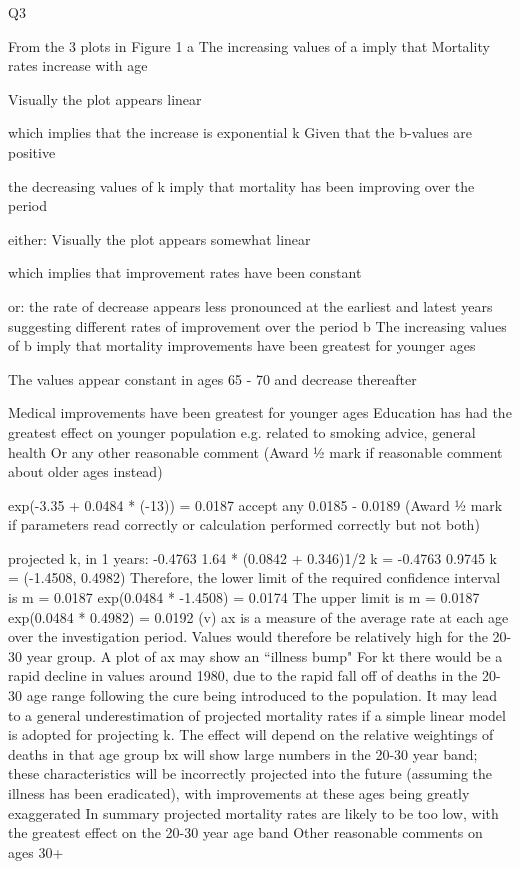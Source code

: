 \documentclass[a4paper,12pt]{article}
\begin{document}
Q3
\item  
From the 3 plots in Figure 1
a
The increasing values of a imply that Mortality rates increase with age \item 
Visually the plot appears linear \item 
which implies that the increase is exponential 
k
Given that the b-values are positive \item 
\medskip 
the decreasing values of k imply that mortality has been improving over the period \item 
either: Visually the plot appears somewhat linear \item 
which implies that improvement rates have been constant \item 
or: the rate of decrease appears less pronounced at the earliest and latest years
suggesting different rates of improvement over the period 
b
The increasing values of b imply that mortality improvements have been greatest
for younger ages \item 
The values appear constant in ages 65 - 70 and decrease thereafter \item 


\item  
Medical improvements have been greatest for younger ages
Education has had the greatest effect on younger population e.g. related to smoking advice, general health
Or any other reasonable comment 
(Award ½ mark if reasonable comment about older ages instead)
\item 
exp(-3.35 + 0.0484 * (-13)) = 0.0187 accept any 0.0185 - 0.0189 
(Award ½ mark if parameters read correctly or calculation performed correctly but not both)
\item 
projected k, in 1 years: -0.4763 1.64 * (0.0842 + 0.346)1/2 
k = -0.4763 0.9745 
k = (-1.4508, 0.4982) 
Therefore, the lower limit of the required confidence interval is
m = 0.0187 exp(0.0484 * -1.4508) = 0.0174 
The upper limit is m = 0.0187 exp(0.0484 * 0.4982) = 0.0192 
(v)
ax is a measure of the average rate at each age over the investigation period. Values
would therefore be relatively high for the 20-30 year group. A plot of ax may show
an “illness bump" 
For kt there would be a rapid decline in values around 1980, due to the rapid fall off
of deaths in the 20-30 age range following the cure being introduced to the
population. It may lead to a general underestimation of projected mortality rates if a simple linear model is adopted for projecting k. The effect will depend on the
relative weightings of deaths in that age group 
bx will show large numbers in the 20-30 year band; these characteristics will be incorrectly projected into the future (assuming the illness has been eradicated), with improvements at these ages being greatly exaggerated 
In summary projected mortality rates are likely to be too low, with the greatest effect
on the 20-30 year age band 
\medskip 
Other reasonable comments on ages 30+ 
\end{document}
